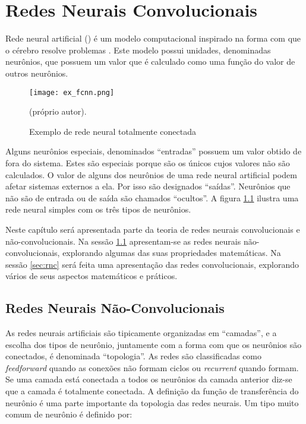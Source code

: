
\chapter{Redes Neurais Convolucionais}

Rede neural artificial () é um modelo computacional inspirado na forma com
que o cérebro resolve problemas \cite{gilbert2000build}. Este modelo possui
unidades, denominadas neurônios, que possuem um valor que é calculado como uma
função do valor de outros neurônios.

\begin{figure}[!htb]
	\centering
	\texttt{[image: ex\_fcnn.png]}
	\caption{Exemplo de rede neural totalmente conectada}
	\label{fig:ex_fcnn}
	(próprio autor).
\end{figure}

Alguns neurônios especiais, denominados “entradas” possuem um valor obtido de
fora do sistema. Estes são especiais porque são os únicos cujos valores não são
calculados. O valor de alguns dos neurônios de uma rede neural artificial podem
afetar sistemas externos a ela. Por isso são designados “saídas”. Neurônios que
não são de entrada ou de saída são chamados “ocultos”. A figura
\ref{fig:ex_fcnn} ilustra uma rede neural simples com os três tipos de
neurônios.

Neste capítulo será apresentada parte da teoria de redes neurais convolucionais
e não-convolucionais. Na sessão \ref{sec:rnnc} apresentam-se as redes neurais
não-convolucionais, explorando algumas das suas propriedades matemáticas. Na
sessão \ref{sec:rnc} será feita uma apresentação das redes convolucionais,
explorando vários de seus aspectos matemáticos e práticos.

\section{Redes Neurais Não-Convolucionais} \label{sec:rnnc}
As redes neurais artificiais são tipicamente organizadas em “camadas”, e a
escolha dos tipos de neurônio, juntamente com a forma com que os neurônios são
conectados, é denominada “topologia”. As redes são classificadas como
\emph{feedforward} quando as conexões não formam ciclos ou \emph{recurrent}
quando formam. Se
uma camada está conectada a todos os neurônios da camada anterior diz-se que a
camada é totalmente conectada.
A definição da função de transferência do neurônio é uma parte importante da
topologia das redes neurais. Um tipo muito comum de neurônio é definido por:

